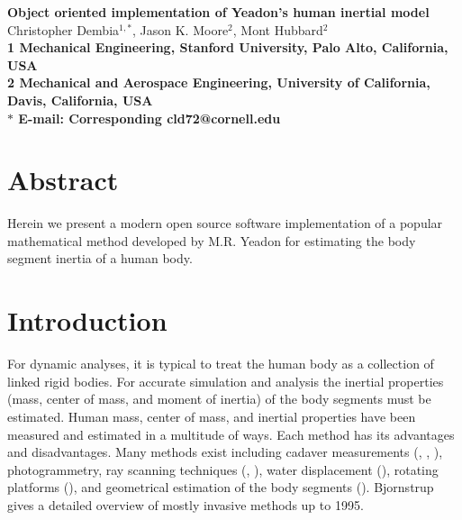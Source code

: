 \documentclass[10pt]{article}
\date{}
\begin{document}
\begin{flushleft}
{\Large
\textbf{Object oriented implementation of Yeadon's human inertial model}
}
\\
Christopher Dembia$^{1,\ast}$,
Jason K. Moore$^{2}$,
Mont Hubbard$^{2}$
\\
\bf{1} Mechanical Engineering, Stanford University, Palo Alto, California, USA
\\
\bf{2} Mechanical and Aerospace Engineering, University of California, Davis, California, USA
\\
$\ast$ E-mail: Corresponding cld72@cornell.edu
\end{flushleft}

\section*{Abstract}
Herein we present a modern open source software implementation of a popular
mathematical method developed by M.R. Yeadon for estimating the body segment
inertia of a human body.

\section*{Introduction}
For dynamic analyses, it is typical to treat the human body as a collection of
linked rigid bodies. For accurate simulation and analysis the inertial
properties (mass, center of mass, and moment of inertia) of the body segments
must be estimated. Human mass, center of mass, and inertial properties have
been measured and estimated in a multitude of ways. Each method has its
advantages and disadvantages. Many methods exist including cadaver measurements
(\cite{Dempster1955}, \cite{Clauser1969}, \cite{Chandler1975}), photogrammetry,
ray scanning techniques (\cite{Zatsiorsky1983}, \cite{Zatsiorsky1990}), water
displacement (\cite{Park1999}), rotating platforms (\cite{Griffiths2005}), and
geometrical estimation of the body segments (\cite{Yeadon1990c}).
Bjornstrup \cite{Bjornstrup1995} gives a detailed overview of mostly invasive
methods up to 1995.
\end{document}
